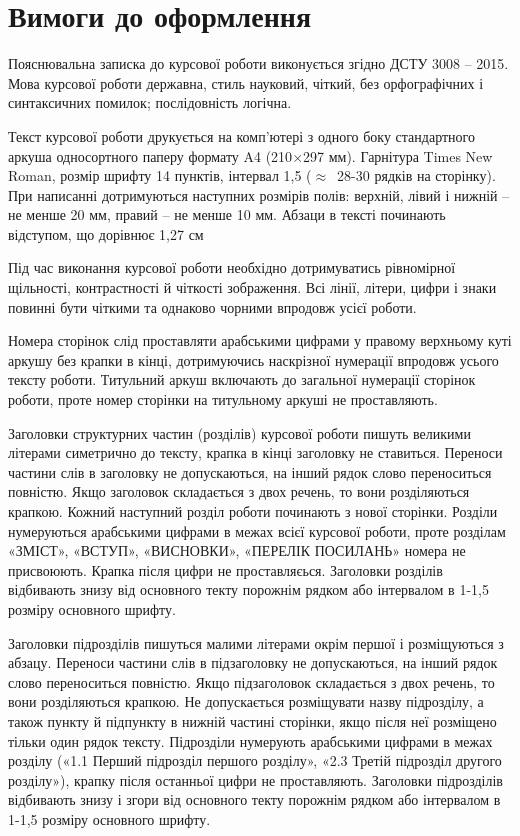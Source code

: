 \chapter{Вимоги до оформлення}
Пояснювальна записка до курсової роботи виконується згідно ДСТУ 3008 – 2015. Мова курсової роботи державна, стиль науковий, чіткий, без орфографічних і синтаксичних помилок; послідовність логічна.

Текст курсової роботи друкується на комп’ютері з одного боку стандартного аркуша односортного паперу формату A4 (210$\times$297 мм). Гарнітура Times New Roman, розмір шрифту 14 пунктів, інтервал 1,5 ($\approx$~28-30 рядків на сторінку). При написанні дотримуються наступних розмірів полів: верхній, лівий і нижній -- не менше 20 мм, правий -- не менше 10 мм. Абзаци в тексті починають відступом, що дорівнює 1,27 см

Під час виконання курсової роботи необхідно дотримуватись рівномірної щільності, контрастності й чіткості зображення. Всі лінії, літери, цифри і знаки повинні бути чіткими та однаково чорними впродовж усієї роботи.

Номера сторінок слід проставляти арабськими цифрами у правому верхньому куті аркушу без крапки в кінці, дотримуючись наскрізної нумерації впродовж усього тексту роботи. Титульний аркуш включають до загальної нумерації сторінок роботи, проте номер сторінки на титульному аркуші не проставляють.

Заголовки структурних частин (розділів) курсової роботи пишуть великими літерами симетрично до тексту, крапка в кінці заголовку не ставиться. Переноси частини слів в заголовку не допускаються, на інший рядок слово переноситься повністю. Якщо заголовок складається з двох речень, то вони розділяються крапкою. Кожний наступний розділ роботи починають з нової сторінки. Розділи нумеруються арабськими цифрами в межах всієї курсової роботи, проте розділам «ЗМІСТ», «ВСТУП», «ВИСНОВКИ», «ПЕРЕЛІК ПОСИЛАНЬ» номера не присвоюють. Крапка після цифри не проставляєься. Заголовки розділів відбивають знизу від основного текту порожнім рядком або інтервалом в 1-1,5 розміру основного шрифту.

Заголовки підрозділів пишуться малими літерами окрім першої і розміщуються з абзацу. Переноси частини слів в підзаголовку не допускаються, на інший рядок слово переноситься повністю. Якщо підзаголовок складається з двох речень, то вони розділяються крапкою. Не допускається розміщувати назву підрозділу, а також пункту й підпункту в нижній частині сторінки, якщо після неї розміщено тільки один рядок тексту. Підрозділи нумерують арабськими цифрами в межах розділу («1.1 Перший підрозділ першого розділу», «2.3 Третій підрозділ другого розділу»), крапку після останньої цифри не проставляють. Заголовки підрозділів відбивають знизу і згори від основного текту порожнім рядком або інтервалом в 1-1,5 розміру основного шрифту.


